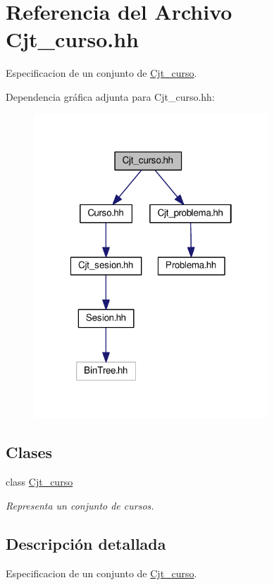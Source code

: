 \hypertarget{_cjt__curso_8hh}{}\section{Referencia del Archivo Cjt\+\_\+curso.\+hh}
\label{_cjt__curso_8hh}


Especificacion de un conjunto de \mbox{\hyperlink{class_cjt__curso}{Cjt\+\_\+curso}}.  


Dependencia gráfica adjunta para Cjt\+\_\+curso.\+hh\+:
\nopagebreak
\begin{figure}[H]
\begin{center}
\leavevmode
\includegraphics[width=250pt]{_cjt__curso_8hh__incl}
\end{center}
\end{figure}
\subsection*{Clases}
\begin{DoxyCompactItemize}
\item 
class \mbox{\hyperlink{class_cjt__curso}{Cjt\+\_\+curso}}
\begin{DoxyCompactList}\small\item\em Representa un conjunto de cursos. \end{DoxyCompactList}\end{DoxyCompactItemize}


\subsection{Descripción detallada}
Especificacion de un conjunto de \mbox{\hyperlink{class_cjt__curso}{Cjt\+\_\+curso}}. 

